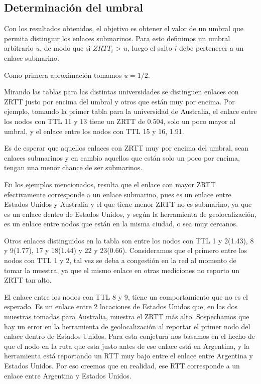 \subsection{Determinación del umbral}

Con los resultados obtenidos, el objetivo es obtener el valor de un umbral que permita distinguir los enlaces submarinos. Para esto definimos un umbral arbitrario $u$, de modo que si $ZRTT_i$ > $u$, luego el salto $i$ debe pertenecer a un enlace submarino.

Como primera aproximación tomamos $u = 1/2$. 

Mirando las tablas para las distintas universidades se distinguen enlaces con ZRTT justo por encima del umbral y otros que están muy por encima.
Por ejemplo, tomando la primer tabla para la universidad de Australia, el enlace entre los nodos con TTL 11 y 13 tiene un ZRTT de 0.504, solo un poco mayor al umbral, y el enlace entre los nodos con TTL 15 y 16, 1.91.

Es de esperar que aquellos enlaces con ZRTT muy por encima del umbral, sean enlaces submarinos y en cambio aquellos que están solo un poco por encima, tengan una menor chance de ser submarinos.

En los ejemplos mencionados, resulta que el enlace con mayor ZRTT efectivamente corresponde a un enlace submarino, pues es un enlace entre Estados Unidos y Australia y el que tiene menor ZRTT no es submarino, ya que es un enlace dentro de Estados Unidos, y según la herramienta de geolocalización, es un enlace entre nodos que están en la misma ciudad, o sea muy cercanos.

Otros enlaces distinguidos en la tabla son entre los nodos con TTL 1 y 2(1.43), 8 y 9(1.77), 17 y 18(1.44) y 22 y 23(0.66).
Consideramos que el primero entre los nodos con TTL 1 y 2, tal vez se deba a congestión en la red al momento de tomar la muestra, ya que el mismo enlace en otras mediciones no reporto un ZRTT tan alto. 

El enlace entre los nodos con TTL 8 y 9, tiene un comportamiento que no es el esperado. Es un enlace entre 2 locaciones de Estados Unidos que, en las dos muestras tomadas para Australia, muestra el ZRTT más alto. Sospechamos que hay un error en la herramienta de geolocalización al reportar el primer nodo del enlace dentro de Estados Unidos. Para esta conjetura nos basamos en el hecho de que el nodo en la ruta que esta justo antes de ese enlace está en Argentina, y la herramienta está reportando un RTT muy bajo entre el enlace entre Argentina y Estados Unidos. Por eso creemos que en realidad, ese RTT corresponde a un enlace entre Argentina y Estados Unidos.


